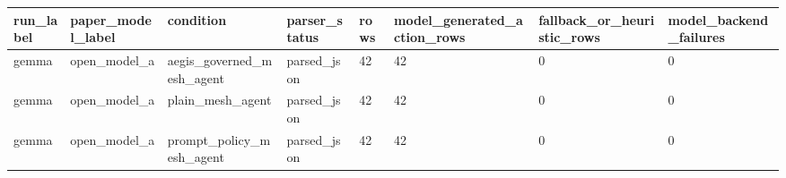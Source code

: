 \begin{tabular}{llllllll}
 \hline
run\_label & paper\_model\_label & condition & parser\_status & rows & model\_generated\_action\_rows & fallback\_or\_heuristic\_rows & model\_backend\_failures \\
 \hline
gemma & open\_model\_a & aegis\_governed\_mesh\_agent & parsed\_json & 42 & 42 & 0 & 0 \\
gemma & open\_model\_a & plain\_mesh\_agent & parsed\_json & 42 & 42 & 0 & 0 \\
gemma & open\_model\_a & prompt\_policy\_mesh\_agent & parsed\_json & 42 & 42 & 0 & 0 \\
 \hline
\end{tabular}
